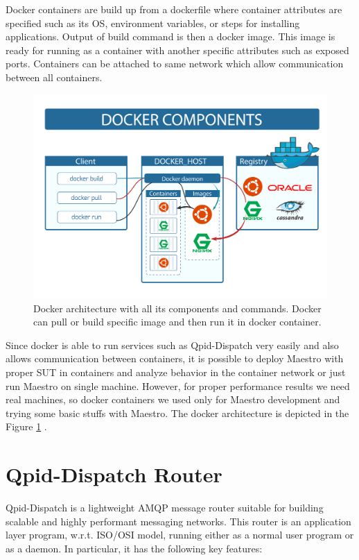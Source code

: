 Docker containers are build up from a dockerfile where container attributes are specified such as its OS, environment variables, or steps for installing applications. Output of build command is then a docker image. This image is ready for running as a container with another specific attributes such as exposed ports. Containers can be attached to same network which allow communication between all containers.

\begin{figure}[H]
  \centering
  \includegraphics[width=13cm]{obrazky-figures/docker.png}
  \caption{Docker architecture with all its components and commands. Docker can pull or build specific image and then run it in docker container.}
  \label{fig:docker_architecture}
\end{figure}


Since docker is able to run services such as Qpid-Dispatch very easily and also allows communication between containers, it is possible to deploy Maestro with proper SUT in containers and analyze behavior in the container network or just run Maestro on single machine. However, for proper performance results we need real machines, so docker containers we used only for Maestro development and trying some basic stuffs with Maestro. The docker architecture is depicted in the Figure \ref{fig:docker_architecture} \cite{Docker-img}.

\section{Qpid-Dispatch Router}
Qpid-Dispatch is a lightweight AMQP message router suitable for building scalable and highly performant messaging networks. This router is an application layer program, w.r.t. ISO/OSI\footnotemark{} model, running either as a normal user program or as a daemon. In particular, it has the following key features:

